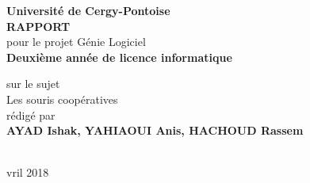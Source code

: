 \begin{titlepage}{
    \begin{center}
        \vspace* {25mm}
        {\Large \textbf {Université de Cergy-Pontoise}} \\
        \vspace* {10mm}
        {\Large \textbf {RAPPORT}} \\
        \vspace* {10mm}
        pour le projet Génie Logiciel \\
        \textbf {Deuxième année de licence informatique} \\
        \vspace* {10mm}

	sur le sujet \\
        \vspace* {10mm}
	{\Huge \textsf{Les souris coopératives}} \\
        \vspace* {10mm}
 	rédigé par \\
        \vspace* {10mm}
        {\Large \textbf {AYAD Ishak, YAHIAOUI Anis, HACHOUD Rassem}} \\
				\vspace* {10mm}
				 \\
        \date Avril 2018
        \vspace* {10mm}
	\end{center}
}
\end{titlepage}
